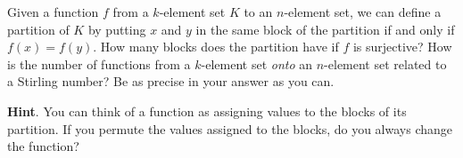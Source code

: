 \documentclass{book}
\begin{document}
\setcounter{cpjt}{203}
\addtocounter{cpjt}{-1}
\begin{activity}\label{activity-196}
\hypertarget{p-1097}{}%
Given a function \(f\) from a \(k\)-element set \(K\) to an \(n\)-element set, we can define a partition of \(K\) by putting \(x\) and \(y\) in the same block of the partition if and only if \(f(x)=f(y)\). How many blocks does the partition have if \(f\) is surjective? How is the number of functions from a \(k\)-element set \emph{onto} an \(n\)-element set related to a Stirling number? Be as precise in your answer as you can.%
\par\smallskip%
\noindent\textbf{Hint}.\hypertarget{hint-128}{}\quad%
\hypertarget{p-1098}{}%
You can think of a function as assigning values to the blocks of its partition. If you permute the values assigned to the blocks, do you always change the function?%
\par\smallskip%
\noindent\end{activity}

\clearpage
\end{document}
